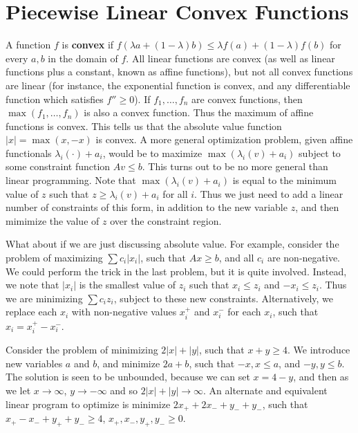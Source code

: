     \section{Piecewise Linear Convex Functions}

    A function $f$ is {\bf convex} if $f(\lambda a + (1 - \lambda) b) \leq \lambda f(a) + (1 - \lambda) f(b)$ for every $a,b$ in the domain of $f$. All linear functions are convex (as well as linear functions plus a constant, known as affine functions), but not all convex functions are linear (for instance, the exponential function is convex, and any differentiable function which satisfies $f'' \geq 0$). If $f_1, \dots, f_n$ are convex functions, then $\max(f_1, \dots, f_n)$ is also a convex function. Thus the maximum of affine functions is convex. This tells us that the absolute value function $|x| = \max(x, -x)$ is convex. A more general optimization problem, given affine functionals $\lambda_i(\cdot) + a_i$, would be to maximize $\max(\lambda_i(v) + a_i)$ subject to some constraint function $Av \leq b$. This turns out to be no more general than linear programming. Note that $\max(\lambda_i(v) + a_i)$ is equal to the minimum value of $z$ such that $z \geq \lambda_i(v) + a_i$ for all $i$. Thus we just need to add a linear number of constraints of this form, in addition to the new variable $z$, and then mimimize the value of $z$ over the constraint region.

    What about if we are just discussing absolute value. For example, consider the problem of maximizing $\sum c_i |x_i|$, such that $Ax \geq b$, and all $c_i$ are non-negative. We could perform the trick in the last problem, but it is quite involved. Instead, we note that $|x_i|$ is the smallest value of $z_i$ such that $x_i \leq z_i$ and $-x_i \leq z_i$. Thus we  are minimizing $\sum c_i z_i$, subject to these new constraints. Alternatively, we replace each $x_i$ with non-negative values $x_i^+$ and $x_i^-$ for each $x_i$, such that $x_i = x_i^+ - x_i^-$.

    \begin{example}
        Consider the problem of minimizing $2 |x| + |y|$, such that $x + y \geq 4$. We introduce new variables $a$ and $b$, and minimize $2a + b$, such that $-x, x \leq a$, and $-y,y \leq b$. The solution is seen to be unbounded, because we can set $x = 4 - y$, and then as we let $x \to \infty$, $y \to -\infty$ and so $2 |x| + |y| \to \infty$. An alternate and equivalent linear program to optimize is minimize $2 x_+ + 2x_- + y_- + y_-$, such that $x_+ - x_- + y_+ + y_- \geq 4$, $x_+, x_-, y_+, y_- \geq 0$.
    \end{example}

